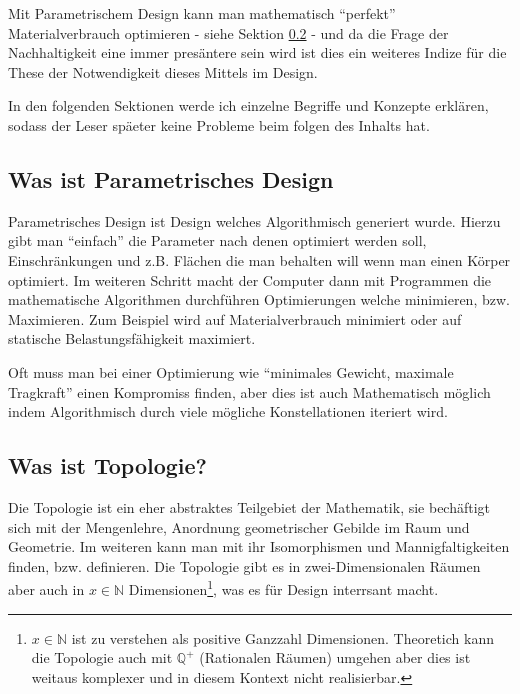 \documentclass{article}
\newcommand\N{\ensuremath{\mathbb{N}}}
\newcommand\Q{\ensuremath{\mathbb{Q}}}
\begin{document}
Mit Parametrischem Design kann man mathematisch ``perfekt'' Materialverbrauch optimieren -
siehe Sektion \ref{sec:topologie} - und da die Frage der Nachhaltigkeit eine immer 
pres\"antere sein wird ist dies ein weiteres Indize f\"ur die These der Notwendigkeit 
dieses Mittels im Design.

\vspace{15pt}

In den folgenden Sektionen werde ich einzelne Begriffe und Konzepte erkl\"aren,
sodass der Leser sp\"aeter keine Probleme beim folgen des Inhalts hat.

    \subsection{Was ist Parametrisches Design}
    Parametrisches Design ist Design welches Algorithmisch generiert wurde. Hierzu gibt man 
    ``einfach'' die Parameter nach denen optimiert werden soll,
    Einschr\"ankungen und z.B. Fl\"achen die man behalten will wenn man einen
    K\"orper optimiert. Im weiteren Schritt macht der Computer dann mit
    Programmen die mathematische Algorithmen durchf\"uhren Optimierungen welche
    minimieren, bzw. Maximieren. Zum Beispiel wird auf Materialverbrauch
    minimiert oder auf statische Belastungsf\"ahigkeit maximiert.

    Oft muss man bei einer Optimierung wie ``minimales Gewicht, maximale
    Tragkraft'' einen Kompromiss finden, aber dies ist auch Mathematisch
    m\"oglich indem Algorithmisch durch viele m\"ogliche Konstellationen
    iteriert wird.


    \subsection{Was ist Topologie?}
    \label{sec:topologie}
    
    Die Topologie ist ein eher abstraktes Teilgebiet der Mathematik, sie
    bech\"aftigt sich mit der Mengenlehre, Anordnung geometrischer Gebilde im
    Raum und Geometrie. Im weiteren kann man mit ihr Isomorphismen und
    Mannigfaltigkeiten finden, bzw. definieren. Die Topologie gibt es in
    zwei-Dimensionalen R\"aumen aber auch in $x \in \N$ Dimensionen\footnote{$x
    \in \N$ ist zu verstehen als positive Ganzzahl Dimensionen. Theoretich kann
    die Topologie auch mit $\Q^+$ (Rationalen R\"aumen) umgehen aber dies ist
    weitaus komplexer und in diesem Kontext nicht realisierbar.}, was es f\"ur
    Design interrsant macht.
\end{document}
